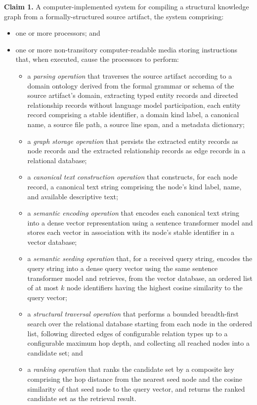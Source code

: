 \documentclass[12pt]{article}
\begin{document}
\noindent\textbf{Claim 1.}\quad
A computer-implemented system for compiling a structural knowledge graph from a
formally-structured source artifact, the system comprising:
\begin{itemize}[leftmargin=2.5em]
  \item one or more processors; and
  \item one or more non-transitory computer-readable media storing instructions
    that, when executed, cause the processors to perform:
    \begin{itemize}[leftmargin=2em]
      \item a \emph{parsing operation} that traverses the source artifact
        according to a domain ontology derived from the formal grammar or schema
        of the source artifact's domain, extracting typed entity records and
        directed relationship records without language model participation, each
        entity record comprising a stable identifier, a domain kind label, a
        canonical name, a source file path, a source line span, and a metadata
        dictionary;
      \item a \emph{graph storage operation} that persists the extracted entity
        records as node records and the extracted relationship records as edge
        records in a relational database;
      \item a \emph{canonical text construction operation} that constructs, for
        each node record, a canonical text string comprising the node's kind
        label, name, and available descriptive text;
      \item a \emph{semantic encoding operation} that encodes each canonical text
        string into a dense vector representation using a sentence transformer
        model and stores each vector in association with its node's stable
        identifier in a vector database;
      \item a \emph{semantic seeding operation} that, for a received query string,
        encodes the query string into a dense query vector using the same sentence
        transformer model and retrieves, from the vector database, an ordered list
        of at most $k$ node identifiers having the highest cosine similarity to
        the query vector;
      \item a \emph{structural traversal operation} that performs a bounded
        breadth-first search over the relational database starting from each node
        in the ordered list, following directed edges of configurable relation
        types up to a configurable maximum hop depth, and collecting all reached
        nodes into a candidate set; and
      \item a \emph{ranking operation} that ranks the candidate set by a composite
        key comprising the hop distance from the nearest seed node and the cosine
        similarity of that seed node to the query vector, and returns the ranked
        candidate set as the retrieval result.
    \end{itemize}
\end{itemize}
\end{document}
